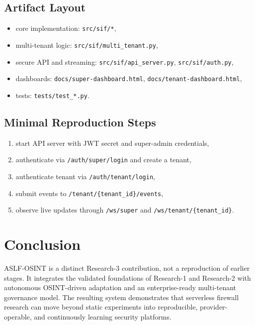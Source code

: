 \documentclass[conference]{IEEEtran}
\begin{document}
\subsection{Artifact Layout}
\begin{itemize}
  \item core implementation: \texttt{src/sif/*},
  \item multi-tenant logic: \texttt{src/sif/multi\_tenant.py},
  \item secure API and streaming: \texttt{src/sif/api\_server.py}, \texttt{src/sif/auth.py},
  \item dashboards: \texttt{docs/super-dashboard.html}, \texttt{docs/tenant-dashboard.html},
  \item tests: \texttt{tests/test\_*.py}.
\end{itemize}

\subsection{Minimal Reproduction Steps}
\begin{enumerate}
  \item start API server with JWT secret and super-admin credentials,
  \item authenticate via \texttt{/auth/super/login} and create a tenant,
  \item authenticate tenant via \texttt{/auth/tenant/login},
  \item submit events to \texttt{/tenant/\{tenant\_id\}/events},
  \item observe live updates through \texttt{/ws/super} and \texttt{/ws/tenant/\{tenant\_id\}}.
\end{enumerate}

\section{Conclusion}
ASLF-OSINT is a distinct Research-3 contribution, not a reproduction of earlier stages. It integrates the validated foundations of Research-1 and Research-2 with autonomous OSINT-driven adaptation and an enterprise-ready multi-tenant governance model. The resulting system demonstrates that serverless firewall research can move beyond static experiments into reproducible, provider-operable, and continuously learning security platforms.



\end{document}
